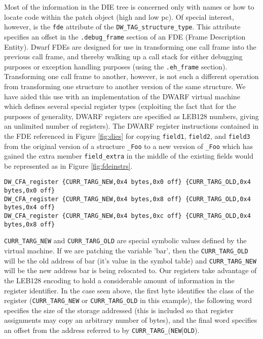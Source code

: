 Most of the information in the DIE tree is concerned only with names
or how to locate code within the patch object (high and low pc). Of
special interest, however, is the \texttt{fde} attribute of the
\texttt{DW\_TAG\_structure\_type}. This attribute specifies an offset
in the \texttt{.debug\_frame} section of an FDE (Frame Description
Entity). Dwarf FDEs are designed for use in transforming one call
frame into the previous call frame, and thereby walking up a call
stack for either debugging purposes or exception handling purposes
(using the \texttt{.eh\_frame} section). Transforming one call frame
to another, however, is not such a different operation from
transforming one structure to another version of the same
structure. We have aided this use with an implementation of the DWARF
virtual machine which defines several special register types
(exploiting the fact that for the purposes of generality, DWARF
registers are specified as LEB128 numbers, giving an unlimited number
of registers). The DWARF register instructions contained in the FDE
referenced in Figure \ref{fig:dies} for copying \texttt{field1}, \texttt{field2}, and
\texttt{field3} from the original version of a structure \texttt{\_Foo}
to a new version of \texttt{\_Foo} which has gained the extra member
\texttt{field\_extra} in the middle of the existing fields would be
represented as in Figure \ref{fig:fdeinstrs}.
\begin{figure*}[ht]
{\small
\begin{center}
\begin{verbatim}
DW_CFA_register {CURR_TARG_NEW,0x4 bytes,0x0 off} {CURR_TARG_OLD,0x4 bytes,0x0 off} 
DW_CFA_register {CURR_TARG_NEW,0x4 bytes,0x8 off} {CURR_TARG_OLD,0x4 bytes,0x4 off} 
DW_CFA_register {CURR_TARG_NEW,0x4 bytes,0xc off} {CURR_TARG_OLD,0x4 bytes,0x8 off} 
\end{verbatim}
\end{center}
}
\caption{FDE instructions for data patching}
\label{fig:fdeinstrs}
\end{figure*}

\texttt{CURR\_TARG\_NEW} and \texttt{CURR\_TARG\_OLD} are special
symbolic values defined by the virtual machine. If we are patching the
variable 'bar', then the \texttt{CURR\_TARG\_OLD} will be the old address of bar
(it's value in the symbol table) and \texttt{CURR\_TARG\_NEW} will be the new
address bar is being relocated to. Our registers take advantage of the
LEB128 encoding to hold a considerable amount of information in the
register identifier. In the case seen above, the first byte identifies
the class of the register (\texttt{CURR\_TARG\_NEW} or \texttt{CURR\_TARG\_OLD} in this
example), the following word specifies the size of the storage
addressed (this is included so that register assignments may copy an
arbitrary number of bytes), and the final word specifies an offset
from the address referred to by \texttt{CURR\_TARG\_}(\texttt{NEW}|\texttt{OLD}).


